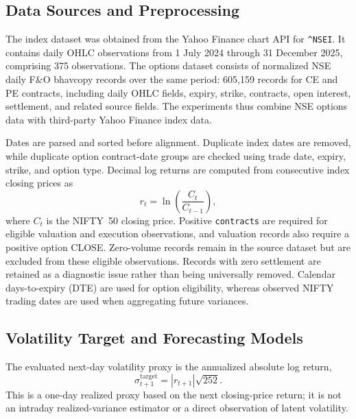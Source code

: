 \documentclass[journal]{IEEEtran}
\begin{document}
\subsection{Data Sources and Preprocessing}

The index dataset was obtained from the Yahoo Finance chart API for \texttt{\string^NSEI}. It contains daily OHLC observations from 1 July 2024 through 31 December 2025, comprising 375 observations. The options dataset consists of normalized NSE daily F\&O bhavcopy records over the same period: 605,159 records for CE and PE contracts, including daily OHLC fields, expiry, strike, contracts, open interest, settlement, and related source fields. The experiments thus combine NSE options data with third-party Yahoo Finance index data.

Dates are parsed and sorted before alignment. Duplicate index dates are removed, while duplicate option contract-date groups are checked using trade date, expiry, strike, and option type. Decimal log returns are computed from consecutive index closing prices as
\begin{equation}
r_t=\ln\left(\frac{C_t}{C_{t-1}}\right),
\end{equation}
where $C_t$ is the NIFTY~50 closing price. Positive \texttt{contracts} are required for eligible valuation and execution observations, and valuation records also require a positive option CLOSE. Zero-volume records remain in the source dataset but are excluded from these eligible observations. Records with zero settlement are retained as a diagnostic issue rather than being universally removed. Calendar days-to-expiry (DTE) are used for option eligibility, whereas observed NIFTY trading dates are used when aggregating future variances.

\subsection{Volatility Target and Forecasting Models}

The evaluated next-day volatility proxy is the annualized absolute log return,
\begin{equation}
\sigma^{\mathrm{target}}_{t+1}=\left|r_{t+1}\right|\sqrt{252}.
\end{equation}
This is a one-day realized proxy based on the next closing-price return; it is not an intraday realized-variance estimator or a direct observation of latent volatility.
\end{document}
